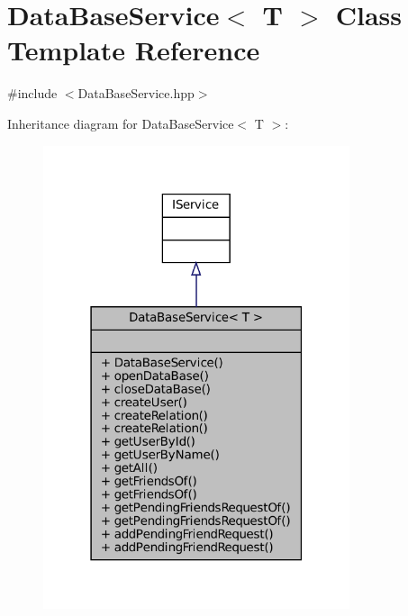 \hypertarget{classDataBaseService}{}\section{Data\+Base\+Service$<$ T $>$ Class Template Reference}
\label{classDataBaseService}


{\ttfamily \#include $<$Data\+Base\+Service.\+hpp$>$}



Inheritance diagram for Data\+Base\+Service$<$ T $>$\+:
\nopagebreak
\begin{figure}[H]
\begin{center}
\leavevmode
\includegraphics[width=255pt]{classDataBaseService__inherit__graph}
\end{center}
\end{figure}


